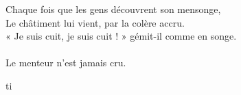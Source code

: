 \documentclass[a4paper,12pt,bibliography=totoc,index=totoc,twoside,francais]{scrbook}
\begin{document}


\frontmatter
\begin{flushright}
Chaque fois que les gens découvrent son mensonge,\\
Le châtiment lui vient, par la colère accru.\\
« Je suis cuit, je suis cuit ! » gémit-il comme en songe.\\
~\\
Le menteur n'est jamais cru.\\
\end{flushright}

\tableofcontents
\listoftables
\listoffigures

\mainmatter








\appendix

%
\gls{ti}

\backmatter
\nocite{*}
\printbibliography
\printindex

\glsaddall
\printglossaries

\cleardoublepage

\end{document}
